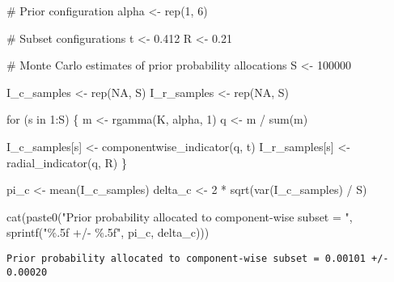 \documentclass[
  letterpaper,
  DIV=11,
  numbers=noendperiod]{scrartcl}
\newenvironment{Shaded}{\begin{snugshade}}{\end{snugshade}}
\newcommand{\CommentTok}[1]{\textcolor[rgb]{0.37,0.37,0.37}{#1}}
\newcommand{\ConstantTok}[1]{\textcolor[rgb]{0.56,0.35,0.01}{#1}}
\newcommand{\ControlFlowTok}[1]{\textcolor[rgb]{0.00,0.23,0.31}{#1}}
\newcommand{\DecValTok}[1]{\textcolor[rgb]{0.68,0.00,0.00}{#1}}
\newcommand{\FloatTok}[1]{\textcolor[rgb]{0.68,0.00,0.00}{#1}}
\newcommand{\FunctionTok}[1]{\textcolor[rgb]{0.28,0.35,0.67}{#1}}
\newcommand{\NormalTok}[1]{\textcolor[rgb]{0.00,0.23,0.31}{#1}}
\newcommand{\OtherTok}[1]{\textcolor[rgb]{0.00,0.23,0.31}{#1}}
\newcommand{\SpecialCharTok}[1]{\textcolor[rgb]{0.37,0.37,0.37}{#1}}
\newcommand{\StringTok}[1]{\textcolor[rgb]{0.13,0.47,0.30}{#1}}
\begin{document}
\begin{Shaded}
\begin{Highlighting}[]
\CommentTok{\# Prior configuration}
\NormalTok{alpha }\OtherTok{\textless{}{-}} \FunctionTok{rep}\NormalTok{(}\DecValTok{1}\NormalTok{, }\DecValTok{6}\NormalTok{)}

\CommentTok{\# Subset configurations}
\NormalTok{t }\OtherTok{\textless{}{-}} \FloatTok{0.412}
\NormalTok{R }\OtherTok{\textless{}{-}} \FloatTok{0.21}

\CommentTok{\# Monte Carlo estimates of prior probability allocations}
\NormalTok{S }\OtherTok{\textless{}{-}} \DecValTok{100000}

\NormalTok{I\_c\_samples }\OtherTok{\textless{}{-}} \FunctionTok{rep}\NormalTok{(}\ConstantTok{NA}\NormalTok{, S)}
\NormalTok{I\_r\_samples }\OtherTok{\textless{}{-}} \FunctionTok{rep}\NormalTok{(}\ConstantTok{NA}\NormalTok{, S)}

\ControlFlowTok{for}\NormalTok{ (s }\ControlFlowTok{in} \DecValTok{1}\SpecialCharTok{:}\NormalTok{S) \{}
\NormalTok{  m }\OtherTok{\textless{}{-}} \FunctionTok{rgamma}\NormalTok{(K, alpha, }\DecValTok{1}\NormalTok{)}
\NormalTok{  q }\OtherTok{\textless{}{-}}\NormalTok{ m }\SpecialCharTok{/} \FunctionTok{sum}\NormalTok{(m)}

\NormalTok{  I\_c\_samples[s] }\OtherTok{\textless{}{-}} \FunctionTok{componentwise\_indicator}\NormalTok{(q, t)}
\NormalTok{  I\_r\_samples[s] }\OtherTok{\textless{}{-}} \FunctionTok{radial\_indicator}\NormalTok{(q, R)}
\NormalTok{\}}
\end{Highlighting}
\end{Shaded}

\begin{Shaded}
\begin{Highlighting}[]
\NormalTok{pi\_c }\OtherTok{\textless{}{-}} \FunctionTok{mean}\NormalTok{(I\_c\_samples)}
\NormalTok{delta\_c }\OtherTok{\textless{}{-}} \DecValTok{2} \SpecialCharTok{*} \FunctionTok{sqrt}\NormalTok{(}\FunctionTok{var}\NormalTok{(I\_c\_samples) }\SpecialCharTok{/}\NormalTok{ S)}

\FunctionTok{cat}\NormalTok{(}\FunctionTok{paste0}\NormalTok{(}\StringTok{"Prior probability allocated to component{-}wise subset = "}\NormalTok{,}
           \FunctionTok{sprintf}\NormalTok{(}\StringTok{"\%.5f +/{-} \%.5f"}\NormalTok{, pi\_c, delta\_c)))}
\end{Highlighting}
\end{Shaded}

\begin{verbatim}
Prior probability allocated to component-wise subset = 0.00101 +/- 0.00020
\end{verbatim}
\end{document}
